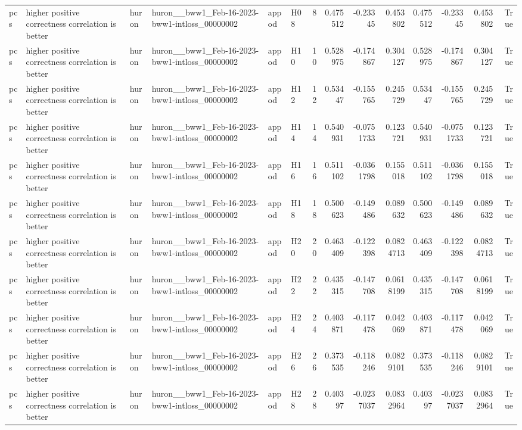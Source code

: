 \begin{longtable}{llllllrrrrrrrr}
pcs & higher positive correctness correlation is better & huron & huron\_\_bww1\_Feb-16-2023-bww1-intloss\_00000002 & appod & H08 & 8 & 0.475512 & -0.23345 & 0.453802 & 0.475512 & -0.23345 & 0.453802 & True \\
pcs & higher positive correctness correlation is better & huron & huron\_\_bww1\_Feb-16-2023-bww1-intloss\_00000002 & appod & H10 & 10 & 0.528975 & -0.174867 & 0.304127 & 0.528975 & -0.174867 & 0.304127 & True \\
pcs & higher positive correctness correlation is better & huron & huron\_\_bww1\_Feb-16-2023-bww1-intloss\_00000002 & appod & H12 & 12 & 0.53447 & -0.155765 & 0.245729 & 0.53447 & -0.155765 & 0.245729 & True \\
pcs & higher positive correctness correlation is better & huron & huron\_\_bww1\_Feb-16-2023-bww1-intloss\_00000002 & appod & H14 & 14 & 0.540931 & -0.0751733 & 0.123721 & 0.540931 & -0.0751733 & 0.123721 & True \\
pcs & higher positive correctness correlation is better & huron & huron\_\_bww1\_Feb-16-2023-bww1-intloss\_00000002 & appod & H16 & 16 & 0.511102 & -0.0361798 & 0.155018 & 0.511102 & -0.0361798 & 0.155018 & True \\
pcs & higher positive correctness correlation is better & huron & huron\_\_bww1\_Feb-16-2023-bww1-intloss\_00000002 & appod & H18 & 18 & 0.500623 & -0.149486 & 0.089632 & 0.500623 & -0.149486 & 0.089632 & True \\
pcs & higher positive correctness correlation is better & huron & huron\_\_bww1\_Feb-16-2023-bww1-intloss\_00000002 & appod & H20 & 20 & 0.463409 & -0.122398 & 0.0824713 & 0.463409 & -0.122398 & 0.0824713 & True \\
pcs & higher positive correctness correlation is better & huron & huron\_\_bww1\_Feb-16-2023-bww1-intloss\_00000002 & appod & H22 & 22 & 0.435315 & -0.147708 & 0.0618199 & 0.435315 & -0.147708 & 0.0618199 & True \\
pcs & higher positive correctness correlation is better & huron & huron\_\_bww1\_Feb-16-2023-bww1-intloss\_00000002 & appod & H24 & 24 & 0.403871 & -0.117478 & 0.042069 & 0.403871 & -0.117478 & 0.042069 & True \\
pcs & higher positive correctness correlation is better & huron & huron\_\_bww1\_Feb-16-2023-bww1-intloss\_00000002 & appod & H26 & 26 & 0.373535 & -0.118246 & 0.0829101 & 0.373535 & -0.118246 & 0.0829101 & True \\
pcs & higher positive correctness correlation is better & huron & huron\_\_bww1\_Feb-16-2023-bww1-intloss\_00000002 & appod & H28 & 28 & 0.40397 & -0.0237037 & 0.0832964 & 0.40397 & -0.0237037 & 0.0832964 & True \\

\end{longtable}

